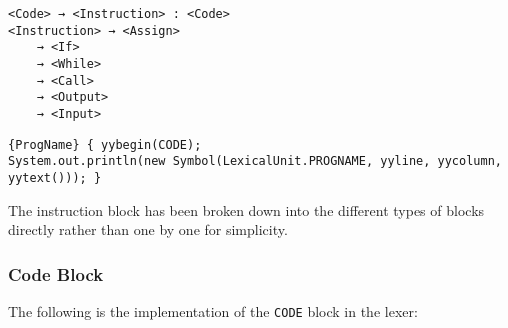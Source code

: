     \begin{verbatim}
<Code> → <Instruction> : <Code>
<Instruction> → <Assign>
    → <If>
    → <While>
    → <Call>
    → <Output>
    → <Input>
	\end{verbatim}
    \begin{table}[h]
		\centering
		\caption{ProgName and transition to the CODE block}
	\end{table}

    \begin{verbatim}
{ProgName} { yybegin(CODE);
System.out.println(new Symbol(LexicalUnit.PROGNAME, yyline, yycolumn, yytext())); }
	\end{verbatim}

    \begin{table}[h]
		\centering
		\caption{ProgName and transition to the CODE block}
	\end{table}

	The instruction block has been broken down into the different types of blocks directly rather than one by one for simplicity.\\

\subsubsection{Code Block}

	The following is the implementation of the \texttt{CODE} block in the lexer:

